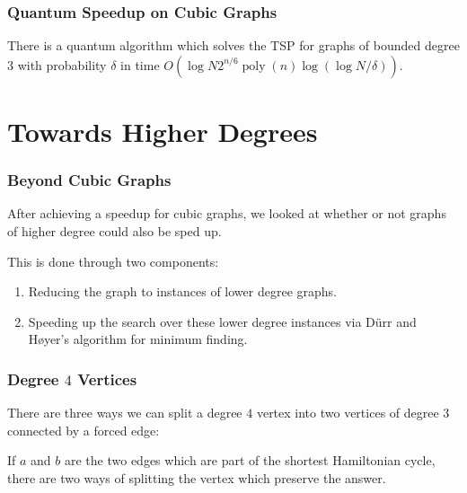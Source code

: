 \documentclass[]{beamer}
\DeclareMathOperator{\poly}{poly}
\begin{document}
\begin{frame}
\frametitle{Quantum Speedup on Cubic Graphs}
\begin{theorem}
There is a quantum algorithm which solves the TSP for graphs of bounded degree $3$ with probability $\delta$ in time $O(\log N2^{n/6}\poly(n)\log(\log N/\delta))$.
\end{theorem}
\end{frame}

\section{Towards Higher Degrees}

\begin{frame}
\frametitle{Beyond Cubic Graphs}
After achieving a speedup for cubic graphs, we looked at whether or not graphs of higher degree could also be sped up.

This is done through two components:
\begin{enumerate}
\item Reducing the graph to instances of lower degree graphs.
\item Speeding up the search over these lower degree instances via D\"urr and H\o yer's algorithm for minimum finding.
\end{enumerate}
\end{frame}

\begin{frame}
\frametitle{Degree $4$ Vertices}

There are three ways we can split a degree $4$ vertex into two vertices of degree $3$ connected by a forced edge:

\begin{center}
\end{center}

If $a$ and $b$ are the two edges which are part of the shortest Hamiltonian cycle, there are two ways of splitting the vertex which preserve the answer.
\end{frame}
\end{document}
